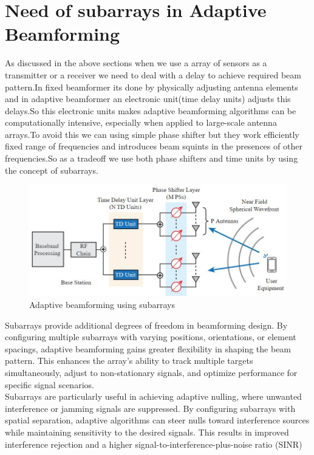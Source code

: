 \section{Need of subarrays in Adaptive Beamforming}
 As discussed in the above sections when we use a array of sensors as a transmitter or a receiver we need to deal with a delay to achieve required beam pattern.In fixed beamformer its done by physically adjusting antenna elements and in adaptive beamformer an electronic unit(time delay units) adjusts this delays.So this electronic units makes adaptive beamforming algorithms can be computationally intensive, especially when applied to large-scale antenna arrays.To avoid this we can using simple phase shifter but they work efficiently fixed range of frequencies and introduces beam squints in the presences of other frequencies.So as a tradeoff we use both phase shifters and time units by using the concept of subarrays.\\
\begin{figure}[h]
\centering
\includegraphics[scale=0.8]{Chapter2/Figures/1 main}		
\caption{ \label{fig:1}Adaptive beamforming using subarrays}
\end{figure} 

Subarrays provide additional degrees of freedom in beamforming design. By configuring multiple subarrays with varying positions, orientations, or element spacings, adaptive beamforming gains greater flexibility in shaping the beam pattern. This enhances the array's ability to track multiple targets simultaneously, adjust to non-stationary signals, and optimize performance for specific signal scenarios.\\
Subarrays are particularly useful in achieving adaptive nulling, where unwanted interference or jamming signals are suppressed. By configuring subarrays with spatial separation, adaptive algorithms can steer nulls toward interference sources while maintaining sensitivity to the desired signals. This results in improved interference rejection and a higher signal-to-interference-plus-noise ratio (SINR)  
 
